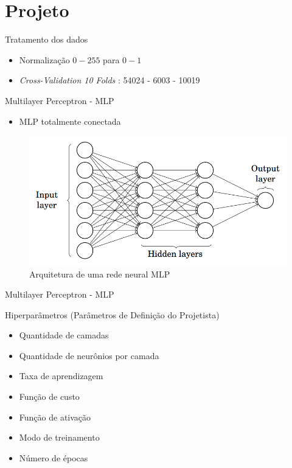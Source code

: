 \documentclass[xcolor=dvipsnames]{beamer}
\begin{document}
    \section{Projeto}  
        \begin{frame}{Tratamento dos dados}
            \begin{itemize}
                \item Normalização $0-255$ para $0-1$
                \item \textit{Cross-Validation 10 Folds} : 54024 - 6003 - 10019
            \end{itemize}
        \end{frame}
        \begin{frame}{Multilayer Perceptron - MLP}
            \begin{itemize}
                \item MLP totalmente conectada
            \end{itemize}
            \begin{figure}
                \centering
                \includegraphics[scale=0.4]{Imagens/neural.png}
                \caption{Arquitetura de uma rede neural MLP}
                \label{fig:redeneural}
            \end{figure}
        \end{frame}
        \begin{frame}{Multilayer Perceptron - MLP}
            \begin{block}{Hiperparâmetros (Parâmetros de Definição do Projetista)}
        		\begin{itemize}
                    \item Quantidade de camadas
                    \item Quantidade de neurônios por camada
                    \item Taxa de aprendizagem
                    \item Função de custo
                    \item Função de ativação
                    \item Modo de treinamento
                    \item Número de épocas
                \end{itemize}
            \end{block}  
        \end{frame}
\end{document}
